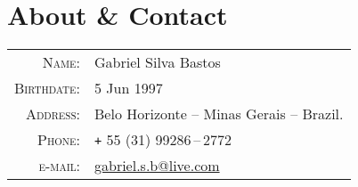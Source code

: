 \documentclass[a4paper,10pt]{article}
\renewcommand\#{\protect\scalebox{0.8}{\protect\raisebox{0.4ex}{\char"0023}}}
\begin{document}
\pagestyle{empty} %

\par{
  \bigskip
  \par
}

\section{About {\normalfont\&} Contact}

\begin{tabular}{rl}
  \textsc{Name:}      & Gabriel Silva Bastos \\
  \textsc{Birthdate:} & 5 Jun 1997 \\
  \textsc{Address:}   & Belo Horizonte -- Minas Gerais -- Brazil. \\
  \textsc{Phone:}     & \texttt{+} 55 (31) 99286\,--\,2772 \\
  \textsc{e-mail:}    & \href{mailto:gabriel.s.b@live.com}{gabriel.s.b@live.com}
\end{tabular}
\end{document}
